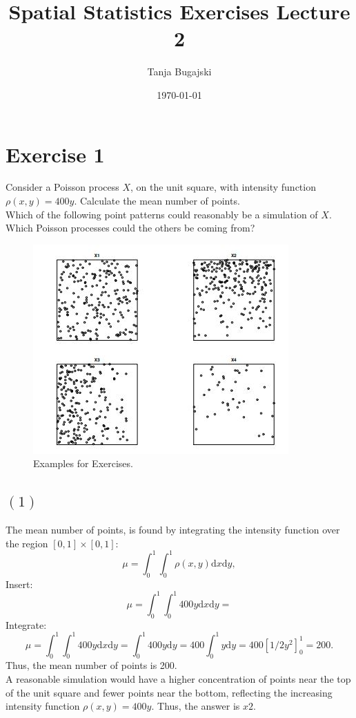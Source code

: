 \documentclass{article}
\title{Spatial Statistics Exercises Lecture 2}
\author{Tanja Bugajski}
\date{\today}
\begin{document}
\maketitle
\section*{Exercise 1}
Consider a Poisson process $X$, on the unit square, with intensity function $\rho(x,y)=400y$. 
Calculate the mean number of points.\\
Which of the following point patterns could reasonably be a simulation of $X$. 
Which Poisson processes could the others be coming from?
\begin{figure}[h!]
    \centering
    \includegraphics[width=\textwidth]{Ex2.JPG}
    \caption{Examples for Exercises.}
\end{figure}
\subsection*{$(1)$  }
The mean number of points, is found by integrating the intensity function over the region $[0,1]\times [0,1]$:
\[
\mu=\int_{0}^{1}\int_{0}^{1} \rho(x,y)\text{d}x \text{d}y,
\]
Insert:
\[
\mu=\int_{0}^{1}\int_{0}^{1} 400y \text{d}x \text{d}y=
\] 
Integrate:
\[
\mu=\int_{0}^{1}\int_{0}^{1} 400y \text{d}x \text{d}y=\int_{0}^{1}400y \text{d}y=400\int_{0}^{1}y \text{d}y=400\left[1/2y^2\right]_0^1=200.
\] 
Thus, the mean number of points is 200.\\

A reasonable simulation would have a higher concentration of points near the top of the unit square and fewer points near the bottom, reflecting the increasing intensity function $\rho(x,y)=400y$.
Thus, the answer is $x2$.\\
\end{document}

